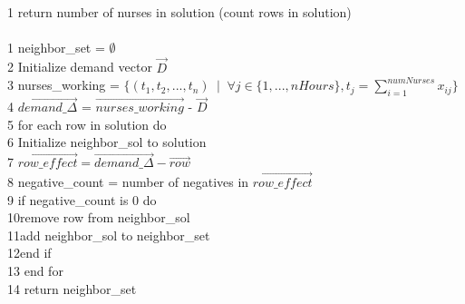 \documentclass[11pt]{article}
\begin{document}
{\\
1 return number of nurses in solution (count rows in solution)\\

\\
1  neighbor\_set = $\emptyset$\\
2  Initialize demand vector $\vec{D}$\\
3  nurses\_working = $\{(t_1,t_2,...,t_n) \phantom{a}|\phantom{a} \forall j \in \{1,...,nHours\}, t_j = \sum_{i=1}^{numNurses} x_{ij}\}$\\
4  $\vec{demand\_\Delta}$ = $\vec{nurses\_working}$ - $\vec{D}$\\
5  for each row in solution do\\
6\hspace*{.4cm} Initialize neighbor\_sol to solution\\
7\hspace*{.4cm} $\vec{row\_effect} = \vec{demand\_\Delta} - \vec{row}$\\
8\hspace*{.4cm} negative\_count = number of negatives in $\vec{row\_effect}$\\
9\hspace*{.4cm} if negative\_count is 0 do\\
10\hspace*{.8cm}remove row from neighbor\_sol\\
11\hspace*{.8cm}add neighbor\_sol to neighbor\_set\\
12\hspace*{.4cm}end if\\
13 end for\\
14 return neighbor\_set\\


\pagebreak
\begin{appendix}


\end{appendix}}
\end{document}
